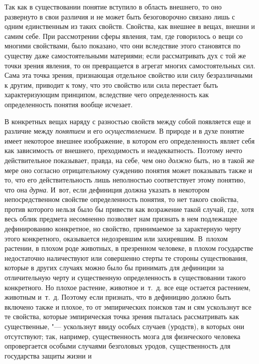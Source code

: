 {{Так как в существовании понятие вступило в область внешнего,
то оно развернуто в свои различия и не может быть безоговорочно связано
лишь с одним единственным из таких свойств. Свойства, как внешнее в вещах,
внешни и самим себе. При рассмотрении сферы явления, там, где говорилось о
вещи со многими свойствами, было показано, что они вследствие этого
становятся по существу даже самостоятельными материями; если рассматривать
дух с той же точки зрения явления, то он превращается в агрегат многих
самостоятельных сил. Сама эта точка зрения, признающая отдельное свойство
или силу безразличными к другим, приводит к тому, что это свойство или сила
перестает быть характеризующим принципом, вследствие чего определенность
как определенность понятия вообще исчезает.

В конкретных вещах наряду с разностью свойств между собой
появляется еще и различие между
{\em понятием} и его
{\em осуществлением}. В
природе и в духе понятие имеет некоторое внешнее изображение, в котором его
определенность являет себя как зависимость от внешнего, преходимость и
неадекватность. Поэтому нечто действительное показывает, правда, на себе,
чем оно {\em должно}
быть, но в такой же мере оно согласно отрицательному суждению
понятия может показывать также и то, что его действительность лишь
неполностью соответствует этому понятию, что она
{\em дурна}. И~вот, если
дефиниция должна указать в некотором непосредственном свойстве
определенность понятия, то нет такого свойства, против которого нельзя было
бы привести как возражение такой случай, где, хотя весь облик предмета
несомненно позволяет нам признать в нем подлежащее
дефинированию конкретное, но свойство, принимаемое за характерную черту
этого конкретного, оказывается недозревшим или захиревшим. В~плохом
растении, в плохом роде животных, в презренном человеке, в плохом
государстве недостаточно наличествуют или совершенно стерты те стороны
существования, которые в других случаях можно было бы принимать для
дефиниции за отличительную черту и существенную определенность в
существовании такого конкретного. Но плохое растение, животное и~т.~д. все
еще остается растением, животным и~т.~д. Поэтому если признать, что в
дефиницию должно быть включено также и плохое, то от эмпирических поисков
там и сям ускользнут все те свойства, которые эмпирическая точка зрения
пыталась рассматривать как существенные, "--- ускользнут ввиду
особых случаев (уродств), в которых они отсутствуют; так, например,
существенность мозга для физического человека опровергается особыми
случаями безголовых уродов, существенность для государства защиты жизни и
}}
